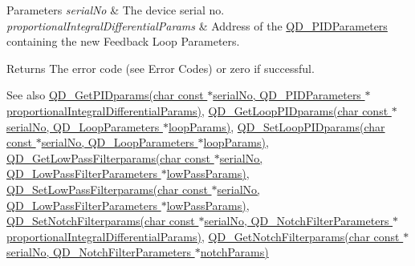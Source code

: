 \begin{DoxyParams}{Parameters}
{\em serial\+No} & The device serial no. \\
\hline
{\em proportional\+Integral\+Differential\+Params} & Address of the \hyperlink{struct_q_d___p_i_d_parameters}{Q\+D\+\_\+\+P\+I\+D\+Parameters} containing the new Feedback Loop Parameters. \\
\hline
\end{DoxyParams}
\begin{DoxyReturn}{Returns}
The error code (see Error Codes) or zero if successful. 
\end{DoxyReturn}
\begin{DoxySeeAlso}{See also}
\hyperlink{group___t_cube_quad_ga2e1be6be7d8bb5c822766a44205889ae}{Q\+D\+\_\+\+Get\+P\+I\+Dparams(char const $\ast$serial\+No, Q\+D\+\_\+\+P\+I\+D\+Parameters $\ast$proportional\+Integral\+Differential\+Params)}, \hyperlink{group___t_cube_quad_ga9dfc01ca4b37b2f0c662b8d8def06e73}{Q\+D\+\_\+\+Get\+Loop\+P\+I\+Dparams(char const $\ast$serial\+No, Q\+D\+\_\+\+Loop\+Parameters $\ast$loop\+Params)}, \hyperlink{group___t_cube_quad_gad75ed2cff04b2d218326841b2553af0a}{Q\+D\+\_\+\+Set\+Loop\+P\+I\+Dparams(char const $\ast$serial\+No, Q\+D\+\_\+\+Loop\+Parameters $\ast$loop\+Params)}, \hyperlink{group___t_cube_quad_ga698c72e36ea50417955b08b69215fcf5}{Q\+D\+\_\+\+Get\+Low\+Pass\+Filterparams(char const $\ast$serial\+No, Q\+D\+\_\+\+Low\+Pass\+Filter\+Parameters $\ast$low\+Pass\+Params)}, \hyperlink{group___t_cube_quad_ga2e8b2f659d9008af335d876976450bc5}{Q\+D\+\_\+\+Set\+Low\+Pass\+Filterparams(char const $\ast$serial\+No, Q\+D\+\_\+\+Low\+Pass\+Filter\+Parameters $\ast$low\+Pass\+Params)}, \hyperlink{group___t_cube_quad_ga00572c166108d5bd60ed0ab5eae7d83c}{Q\+D\+\_\+\+Set\+Notch\+Filterparams(char const $\ast$serial\+No, Q\+D\+\_\+\+Notch\+Filter\+Parameters $\ast$proportional\+Integral\+Differential\+Params)}, \hyperlink{group___t_cube_quad_ga5132ce023e2c0248a42cb5cdf0a95c3e}{Q\+D\+\_\+\+Get\+Notch\+Filterparams(char const $\ast$serial\+No, Q\+D\+\_\+\+Notch\+Filter\+Parameters $\ast$notch\+Params)}


\end{DoxySeeAlso}
